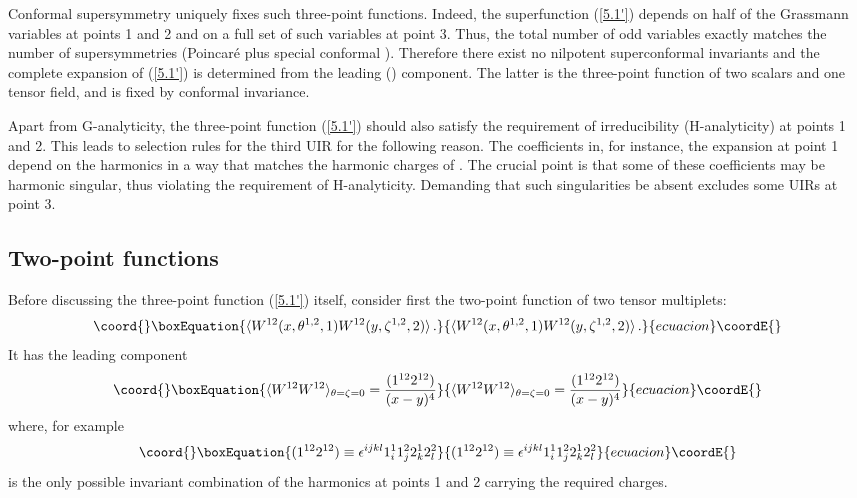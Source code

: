 \documentclass[a4paper,11pt]{article}
\begin{document}
Conformal supersymmetry uniquely fixes such three-point functions. Indeed, the
superfunction (\ref{5.1'}) depends on half of the Grassmann variables at points
1 and 2 and on a full set of such variables at point 3. Thus, the total number
of odd variables exactly matches the number of supersymmetries (Poincar\'e \coordHE{}
plus special conformal \coordHE{}). Therefore there exist no nilpotent superconformal
invariants and the complete \myHighlight{$\theta,\zeta,\lambda$}\coordHE{} expansion of (\ref{5.1'}) is
determined from the leading (\coordHE{}) component. The latter is
the three-point function of two scalars and one tensor field, and is fixed by
conformal invariance.

Apart from G-analyticity, the  three-point function (\ref{5.1'}) should also
satisfy the requirement of \coordHE{} irreducibility (H-analyticity) at
points 1 and 2. This leads to selection rules for the third UIR for the
following reason. The coefficients in, for instance, the \myHighlight{$\theta$}\coordHE{} expansion
at point 1
depend on the harmonics in a way that matches the harmonic \coordHE{} charges of \coordHE{}. The crucial point is that some
of these coefficients may be harmonic singular, thus violating the requirement
of H-analyticity. Demanding that such singularities be absent excludes some
UIRs at point 3.



\subsection{Two-point functions}

Before discussing the three-point function (\ref{5.1'}) itself, consider first
the two-point function of two tensor multiplets:
\begin{equation}\coord{}\boxEquation{\label{5.101}
  \langle W^{12}(x,\theta^{1,2},1)
  W^{12}(y,\zeta^{1,2},2) \rangle \, .
}{\langle W^{12}(x,\theta^{1,2},1)
  W^{12}(y,\zeta^{1,2},2) \rangle \, .
}{ecuacion}\coordE{}\end{equation}
It has the leading component
\begin{equation}\coord{}\boxEquation{\label{5.3}
  \langle W^{12} W^{12}\rangle_{\theta=\zeta=0} = \frac{(1^{12}2^{12})}{(x-y)^4}
}{\langle W^{12} W^{12}\rangle_{\theta=\zeta=0} = \frac{(1^{12}2^{12})}{(x-y)^4}
}{ecuacion}\coordE{}\end{equation}
where, for example
\begin{equation}\coord{}\boxEquation{\label{5.4}
  (1^{12}2^{12}) \equiv \epsilon^{ijkl} 1^1_i 1^2_j 2^1_k 2^2_l
}{(1^{12}2^{12}) \equiv \epsilon^{ijkl} 1^1_i 1^2_j 2^1_k 2^2_l
}{ecuacion}\coordE{}\end{equation}
is the only possible \coordHE{} invariant combination of the harmonics at
points 1 and 2 carrying the required \coordHE{} charges.
\end{document}

